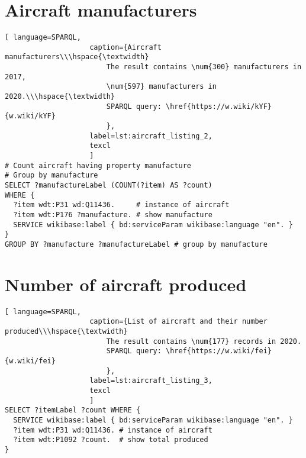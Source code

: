 
\section{Aircraft manufacturers}

\begin{lstlisting}[ language=SPARQL, 
                    caption={Aircraft manufacturers\\\hspace{\textwidth}
                        The result contains \num{300} manufacturers in 2017, 
                        \num{597} manufacturers in 2020.\\\hspace{\textwidth}
                        SPARQL query: \href{https://w.wiki/kYF}{w.wiki/kYF}
                        },
                    label=lst:aircraft_listing_2,
                    texcl 
                    ]
# Count aircraft having property manufacture
# Group by manufacture
SELECT ?manufactureLabel (COUNT(?item) AS ?count) 
WHERE {
  ?item wdt:P31 wd:Q11436.     # instance of aircraft
  ?item wdt:P176 ?manufacture. # show manufacture
  SERVICE wikibase:label { bd:serviceParam wikibase:language "en". }
}
GROUP BY ?manufacture ?manufactureLabel # group by manufacture
\end{lstlisting}


\section{Number of aircraft produced}

\begin{lstlisting}[ language=SPARQL, 
                    caption={List of aircraft and their number produced\\\hspace{\textwidth}
                        The result contains \num{177} records in 2020. 
                        SPARQL query: \href{https://w.wiki/fei}{w.wiki/fei}
                        },
                    label=lst:aircraft_listing_3,
                    texcl 
                    ]
SELECT ?itemLabel ?count WHERE {
  SERVICE wikibase:label { bd:serviceParam wikibase:language "en". }
  ?item wdt:P31 wd:Q11436. # instance of aircraft
  ?item wdt:P1092 ?count.  # show total produced
}
\end{lstlisting}

